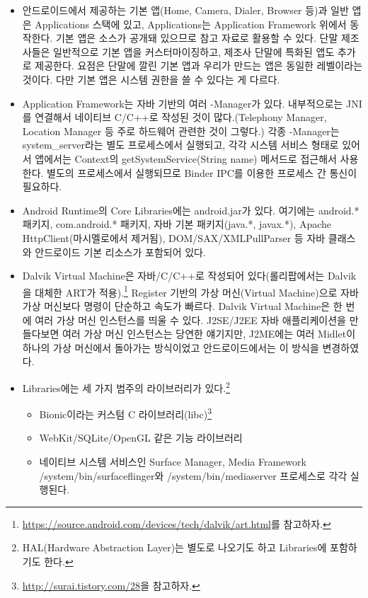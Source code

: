 \begin{itemize}
\item 안드로이드에서 제공하는 기본 앱(Home, Camera, Dialer, Browser 등)과 일반 앱은 Applications 스택에 있고, Applications는 Application Framework 위에서 동작한다. 기본 앱은 소스가 공개돼 있으므로 참고 자료로 활용할 수 있다. 단말 제조사들은 일반적으로 기본 앱을 커스터마이징하고, 제조사 단말에 특화된 앱도 추가로 제공한다. 요점은 단말에 깔린 기본 앱과 우리가 만드는 앱은 동일한 레벨이라는 것이다. 다만 기본 앱은 시스템 권한을 쓸 수 있다는 게 다르다.

\item Application Framework는 자바 기반의 여러 -Manager가 있다. 내부적으로는 JNI를 연결해서 네이티브 C/C++로 작성된 것이 많다.(Telephony Manager, Location Manager 등 주로 하드웨어 관련한 것이 그렇다.) 각종 -Manager는 system\_server라는 별도 프로세스에서 실행되고, 각각 시스템 서비스 형태로 있어서 앱에서는 Context의 getSystemService(String name) 메서드로 접근해서 사용한다. 별도의 프로세스에서 실행되므로 Binder IPC를 이용한 프로세스 간 통신이 필요하다.

\item Android Runtime의 Core Libraries에는 android.jar가 있다. 여기에는 android.* 패키지, com.android.* 패키지, 자바 기본 패키지(java.*, javax.*), Apache HttpClient(마시멜로에서 제거됨), DOM/SAX/XM\-LPullParser 등 자바 클래스와 안드로이드 기본 리소스가 포함되어 있다.

\item Dalvik Virtual Machine은 자바/C/C++로 작성되어 있다(롤리팝에서는 Dalvik을 대체한 ART가 적용).\footnote{\url{https://source.android.com/devices/tech/dalvik/art.html}를 참고하자.} Register 기반의 가상 머신(Virtual Machine)으로 자바 가상 머신보다 명령이 단순하고 속도가 빠르다.
Dalvik Virtual Machine은 한 번에 여러 가상 머신 인스턴스를 띄울 수 있다. J2SE/J2EE 자바 애플리케이션을 만들다보면 여러 가상 머신 인스턴스는 당연한 얘기지만, J2ME에는 여러 Midlet이 하나의 가상 머신에서 돌아가는 방식이었고 안드로이드에서는 이 방식을 변경하였다.

\item Libraries에는 세 가지 범주의 라이브러리가 있다.\footnote{HAL(Hardware Abstraction Layer)는 별도로 나오기도 하고 Libraries에 포함하기도 한다.}
\begin{itemize}
\item Bionic이라는 커스텀 C 라이브러리(libc)\footnote{\url{http://surai.tistory.com/28}을 참고하자.}
\item WebKit/SQLite/OpenGL 같은 기능 라이브러리
\item 네이티브 시스템 서비스인 Surface Manager, Media Framework\\
/system/bin/surfaceflinger와 /system/bin/mediaserver 프로세스로 각각 실행된다.
\end{itemize}


\end{itemize}

